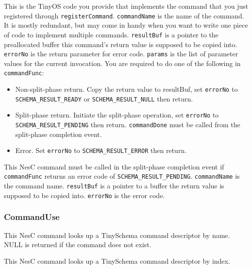 \documentclass[11pt]{article}
\begin{document}

This is the TinyOS code you provide that implements the command
that you just registered through {\tt registerCommand}.
{\tt commandName} is the name of the command.  It is mostly redundant, but may
come in handy when you want to write one piece of code to implement
multiple commands.  {\tt resultBuf} is a pointer to the preallocated buffer
this command's return value is supposed to be copied into.
{\tt errorNo} is the return parameter for error code.  {\tt params} is
the list of parameter values for the current invocation.
You are required to do one of the following in {\tt commandFunc}:
\begin{itemize}
\item Non-split-phase return.  Copy the return value to resultBuf, 
set {\tt *errorNo}
to {\tt SCHEMA\_RESULT\_READY} or {\tt SCHEMA\_RESULT\_NULL} then return.
\item Split-phase return.  Initiate the split-phase operation,
set {\tt *errorNo}
to {\tt SCHEMA\_RESULT\_PENDING} then return.  
{\tt commandDone} must be called
from the split-phase completion event.
\item Error.  Set {\tt *errorNo} to {\tt SCHEMA\_RESULT\_ERROR} then return.
\end{itemize}



This NesC command must be called in the split-phase completion event if
{\tt commandFunc} returns an error code of {\tt SCHEMA\_RESULT\_PENDING}.
{\tt commandName} is the command name.  {\tt resultBuf} is a pointer to
a buffer the return value is supposed to be copied into.
{\tt errorNo} is the error code.

\subsubsection{CommandUse}


This NesC command looks up a TinySchema command descriptor by name.  NULL is returned
if the command does not exist.



This NesC command looks up a TinySchema command descriptor by index.
\end{document}
